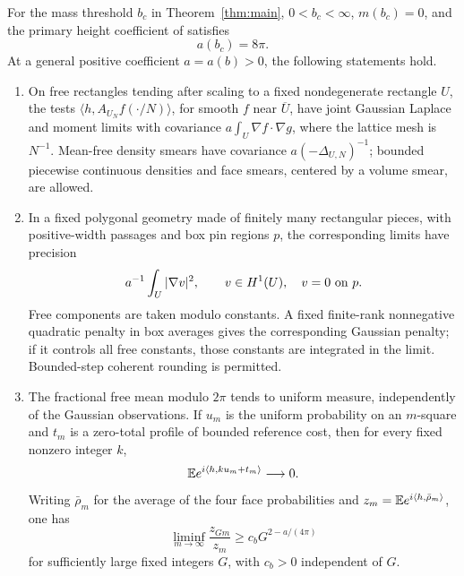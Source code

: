 \begin{proposition}\label{inp:height}
For the mass threshold \(b_c\) in Theorem~\ref{thm:main},
\(0<b_c<\infty\), \(m(b_c)=0\), and the primary height coefficient
of \cite{X} satisfies
\begin{equation}\label{inp:critical-coefficient}
                              a(b_c)=8\pi.
\end{equation}
At a general positive coefficient \(a=a(b)>0\), the following
statements hold.
\begin{enumerate}
\item On free rectangles tending after scaling to a fixed
nondegenerate rectangle \(U\), the tests
\(\langle h,A_{U_N}f(\cdot/N)\rangle\), for smooth \(f\) near
\(\overline U\), have joint Gaussian Laplace and moment limits with
covariance \(a\int_U\nabla f\cdot\nabla g\), where the lattice
mesh is \(N^{-1}\).  Mean-free density smears have
covariance \(a(-\Delta_{U,N})^{-1}\); bounded piecewise continuous
densities and face smears, centered by a volume smear, are allowed.
\item In a fixed polygonal geometry made of finitely many rectangular
pieces, with positive-width passages and box pin regions \(p\), the
corresponding limits have precision
\[
 a^{-1}\int_U|\nabla v|^2,
 \qquad v\in H^1(U),\quad v=0\ \hbox{on }p.
\]
Free components are taken modulo constants.  A fixed finite-rank
nonnegative quadratic penalty in box averages gives the corresponding
Gaussian penalty; if it controls all free constants, those constants
are integrated in the limit.  Bounded-step coherent rounding is
permitted.
\item The fractional free mean modulo \(2\pi\) tends to uniform
measure, independently of the Gaussian observations.  If \(u_m\)
is the uniform probability on an \(m\)-square and \(t_m\) is a
zero-total profile of bounded reference cost, then for every fixed
nonzero integer \(k\),
\[
                  \mathbb E e^{i\langle h,ku_m+t_m\rangle}\longrightarrow0.
\]
Writing \(\bar\rho_m\) for the average of the four face
probabilities and \(z_m=\mathbb E e^{i\langle h,\bar\rho_m\rangle}\), one has
\begin{equation}\label{inp:face-ratio}
 \liminf_{m\to\infty}\frac{z_{Gm}}{z_m}
       \ge c_bG^{2-a/(4\pi)}
\end{equation}
for sufficiently large fixed integers \(G\), with \(c_b>0\)
independent of \(G\).
\end{enumerate}
\end{proposition}

